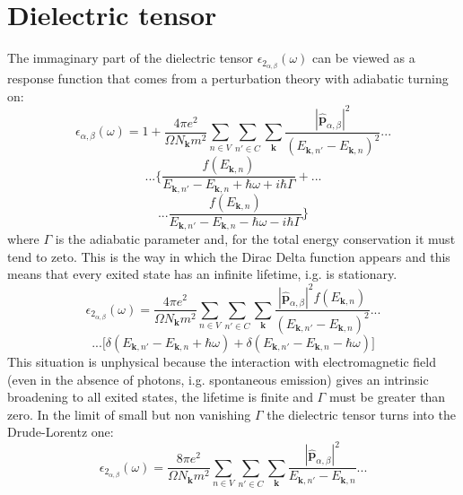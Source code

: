 \documentclass[twocolumn]{article}
\begin{document}
\section{Dielectric tensor}
The immaginary part of the dielectric tensor $\epsilon_{2_{\alpha,\beta}}(\omega)$ can be viewed as a response function 
that comes from a perturbation theory with adiabatic turning on:
\begin{displaymath}
\epsilon_{\alpha,\beta}(\omega)=1+\frac{4 \pi e^2}{\Omega N_{\textbf{k}} m^2}\sum_{n\in V}\sum_{n'\in C}\sum_{\textbf{k}}
\frac{|\hat{\textbf{p}}_{\alpha,\beta}|^2}{(E_{\textbf{k},n'}-E_{\textbf{k},n})^2}...
\end{displaymath}
\begin{displaymath}
...\Bigg\{\frac{f(E_{\textbf{k},n})}{E_{\textbf{k},n'}-E_{\textbf{k},n}+\hbar\omega+i\hbar\Gamma}+...
\end{displaymath}
\begin{equation}
...\frac{f(E_{\textbf{k},n})}{E_{\textbf{k},n'}-E_{\textbf{k},n}-\hbar\omega-i\hbar\Gamma}\Bigg\}
\end{equation}
where $\Gamma$ is the adiabatic parameter and, for the total energy conservation it must tend to zeto. This is the way in 
which the Dirac Delta function appears and this means that every exited state has an infinite lifetime, i.g. is stationary. 
\begin{displaymath}
\epsilon_{2_{\alpha,\beta}}(\omega)=\frac{4 \pi e^2}{\Omega N_{\textbf{k}} m^2}\sum_{n\in V}\sum_{n'\in C}\sum_{\textbf{k}}
\frac{|\hat{\textbf{p}}_{\alpha,\beta}|^2 f(E_{\textbf{k},n})}{(E_{\textbf{k},n'}-E_{\textbf{k},n})^2}...
\end{displaymath}
\begin{equation}
...\bigg[\delta(E_{\textbf{k},n'}-E_{\textbf{k},n}+\hbar\omega)+\delta(E_{\textbf{k},n'}-
E_{\textbf{k},n}-\hbar\omega)\bigg]
\end{equation}
This situation is unphysical because the interaction with 
electromagnetic field (even in the absence of photons, i.g. spontaneous emission) gives an intrinsic broadening to all exited 
states, the lifetime is finite and $\Gamma$ must be greater than zero. In the limit of small but non vanishing $\Gamma$ 
the dielectric tensor turns into the Drude-Lorentz one: 
\begin{displaymath}
\epsilon_{2_{\alpha,\beta}}(\omega)=\frac{8 \pi e^2}{\Omega N_{\textbf{k}} m^2}\sum_{n\in V}\sum_{n'\in C}\sum_{\textbf{k}}
\frac{|\hat{\textbf{p}}_{\alpha,\beta}|^2}{E_{\textbf{k},n'}-E_{\textbf{k},n}}...
\end{displaymath}
\end{document}
